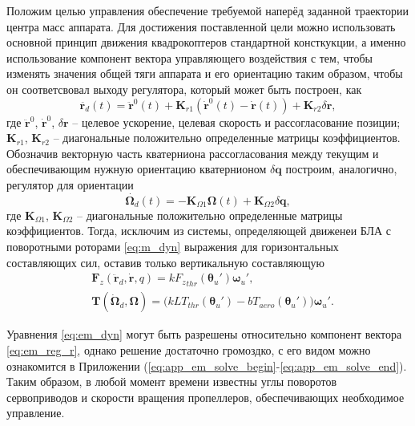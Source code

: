 Положим целью управления обеспечение требуемой наперёд заданной траектории центра масс аппарата.
Для достижения поставленной цели можно использовать основной принцип движения квадрокоптеров стандартной консткукции, а именно использование компонент вектора управляющего воздействия с тем, чтобы изменять значения общей тяги аппарата и его ориентацию таким образом, чтобы он соответсвовал выходу регулятора, который может быть построен, как
\begin{equation} \label{eq:em_reg_r}
\ddot{\bm{r}_d}(t)=
\ddot{\bm{r}}^0(t)+\bm{K}_{r1}(\dot{\bm{r}}^0(t)-\dot{\bm{r}}(t))+\bm{K}_{r2}\delta \bm r,
\end{equation}
где 
$\ddot{\bm{r}}^0$, $\dot{\bm{r}}^0$, $\delta \bm r$ -- целевое ускорение, целевая скорость и рассогласование позиции;
$\bm K_{r1}$, $\bm K_{r2}$ 
-- диагональные положительно определенные матрицы коэффициентов.
Обозначив векторную часть кватерниона рассогласования между текущим и обеспечивающим нужную ориентацию кватернионом
$\delta \bm q$
построим, аналогично, регулятор для ориентации
\begin{equation} \label{eq:em_reg_q}
\dot{\bm{\Omega}_d}(t)=
-\bm{K}_{\Omega1}\bm{\Omega}(t)+\bm{K}_{\Omega2}\delta\bm{q},
\end{equation}
где $\bm K_{\Omega1}$, $\bm K_{\Omega2}$ 
-- диагональные положительно определенные матрицы коэффициентов.
Тогда, исключим из системы, определяющей движенеи БЛА с поворотными роторами \eqref{eq:m_dyn} выражения для горизонтальных составляющих сил, оставив только вертикальную составляющую
\begin{equation} \label{eq:em_dyn}
\begin{aligned}
&\bm F_z(\ddot{\bm r}_d, \dot{\bm r}, q) = k {F_z}_{thr} (\bm \theta_u') \bm \omega_u',\\
&\bm T(\dot{\bm \Omega}_d, \bm\Omega) = \Big(
kLT_{thr}(\bm\theta_u') - bT_{aero}(\bm\theta_u')
\Big)
\bm \omega_u'.
\end{aligned}
\end{equation}

Уравнения \eqref{eq:em_dyn} могут быть разрешены относительно компонент вектора \eqref{eq:em_reg_r}, однако решение достаточно громоздко, с его видом можно ознакомится в Приложении (\ref{eq:app_em_solve_begin}-\ref{eq:app_em_solve_end}).  Таким образом, в любой момент времени известны углы поворотов сервоприводов и скорости вращения пропеллеров, обеспечивающих необходимое управление.

